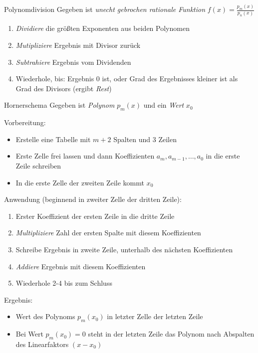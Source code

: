 \documentclass[german]{spicker}
\begin{document}
\begin{algo}{Polynomdivision}
    Gegeben ist \emph{unecht gebrochen rationale Funktion} $f(x) = \frac{p_m(x)}{p_n(x)}$
    \begin{enumerate}
        \item \emph{Dividiere} die größten Exponenten aus beiden Polynomen
        \item \emph{Mutipliziere} Ergebnis mit Divisor zurück
        \item \emph{Subtrahiere} Ergebnis vom Dividenden
        \item Wiederhole, bis:
              \subitem Ergebnis 0 ist, oder
              \subitem Grad des Ergebnisses kleiner ist als Grad des Divisors (ergibt \emph{Rest})
    \end{enumerate}
\end{algo}


\begin{algo}{Hornerschema}
    Gegeben ist \emph{Polynom} $p_m(x)$ und ein \emph{Wert} $x_0$

    Vorbereitung:
    \begin{itemize}
        \item Erstelle eine Tabelle mit $m + 2$ Spalten und 3 Zeilen
        \item Erste Zelle frei lassen und dann Koeffizienten $a_m, a_{m-1}, \ldots, a_0$ in die erste Zeile schreiben
        \item In die erste Zelle der zweiten Zeile kommt $x_0$
    \end{itemize}

    Anwendung (beginnend in zweiter Zelle der dritten Zeile):
    \begin{enumerate}
        \item Erster Koeffizient der ersten Zeile in die dritte Zeile
        \item \emph{Multipliziere} Zahl der ersten Spalte mit diesem Koeffizienten
        \item Schreibe Ergebnis in zweite Zeile, unterhalb des nächsten Koeffizienten
        \item \emph{Addiere} Ergebnis mit diesem Koeffizienten
        \item Wiederhole 2-4 bis zum Schluss
    \end{enumerate}

    Ergebnis:
    \begin{itemize}
        \item Wert des Polynoms $p_m(x_0)$ in letzter Zelle der letzten Zeile
        \item Bei Wert $p_m(x_0) = 0$ steht in der letzten Zeile das Polynom nach Abspalten des Linearfaktors $(x-x_0)$
    \end{itemize}
\end{algo}
\end{document}
